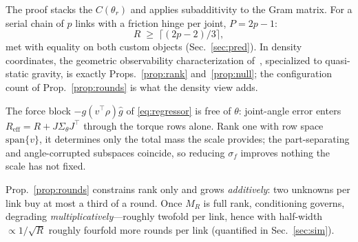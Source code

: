 The proof stacks the $C(\theta_r)$ and applies subadditivity to the Gram
matrix. For a serial chain of $p$ links with a friction hinge
per joint, $P=2p-1$:
\begin{equation}
R\;\ge\;\big\lceil (2p-2)/3\big\rceil ,
\label{eq:chain}
\end{equation}
met with equality on both custom objects (Sec.~\ref{sec:pred}). In density
coordinates, the geometric observability characterization
of~\cite{wensing2024geometric}, specialized to quasi-static gravity, is
exactly Props.~\ref{prop:rank} and~\ref{prop:null}; the configuration count
of Prop.~\ref{prop:rounds} is what the density view adds.

\begin{remark}
\label{rem:channel}
The force block $-g(v^{\!\top}\!\rho)\hat g$ of \eqref{eq:regressor} is
free of $\theta$: joint-angle error enters
$R_{\mathrm{eff}}=R+J\Sigma_\theta J^{\!\top}$ through the torque rows alone.
Rank one with row space $\mathrm{span}\{v\}$, it determines only the total
mass the scale provides; the part-separating and angle-corrupted subspaces
coincide, so reducing $\sigma_f$ improves nothing the scale has not fixed.
\end{remark}

\begin{remark}
\label{rem:cond}
Prop.~\ref{prop:rounds} constrains rank only and grows \emph{additively}:
two unknowns per link buy at most a third of a round. Once $M_R$ is full
rank, conditioning governs, degrading \emph{multiplicatively}---roughly
twofold per link, hence with half-width $\propto1/\sqrt{R}$ roughly fourfold
more rounds per link (quantified in Sec.~\ref{sec:sim}).
\end{remark}

